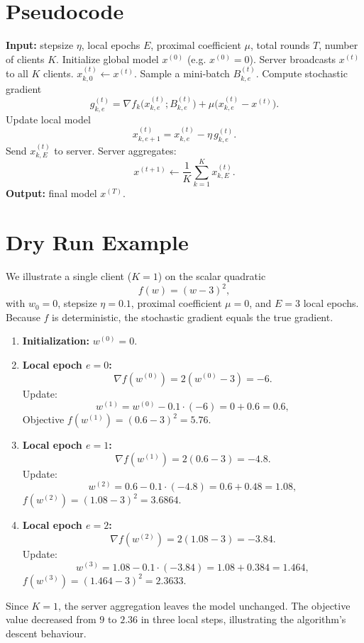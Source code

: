 \documentclass[11pt]{article}
\begin{document}
\section*{Pseudocode}
\begin{algorithm}[H]
\caption{FedProx with Local SGD}
\label{alg:fedprox}
\begin{algorithmic}[1]
\STATE \textbf{Input:} stepsize $\eta$, local epochs $E$, proximal coefficient $\mu$, 
total rounds $T$, number of clients $K$.
\STATE Initialize global model $x^{(0)}$ (e.g. $x^{(0)}=0$).
    \STATE Server broadcasts $x^{(t)}$ to all $K$ clients.
        \STATE $x^{(t)}_{k,0}\gets x^{(t)}$.
            \STATE Sample a mini‑batch $B^{(t)}_{k,e}$.
            \STATE Compute stochastic gradient
            \[
            g^{(t)}_{k,e}= \nabla f_k\bigl(x^{(t)}_{k,e};B^{(t)}_{k,e}\bigr)+\mu\bigl(x^{(t)}_{k,e}-x^{(t)}\bigr).
            \]
            \STATE Update local model
            \[
            x^{(t)}_{k,e+1}=x^{(t)}_{k,e}-\eta\, g^{(t)}_{k,e}.
            \]
        \ENDFOR
        \STATE Send $x^{(t)}_{k,E}$ to server.
    \ENDFOR
    \STATE Server aggregates:
    \[
    x^{(t+1)}\gets\frac{1}{K}\sum_{k=1}^{K}x^{(t)}_{k,E}.
    \]
\ENDFOR
\STATE \textbf{Output:} final model $x^{(T)}$.
\end{algorithmic}
\end{algorithm}

\section*{Dry Run Example}
We illustrate a single client ($K=1$) on the scalar quadratic
\[
f(w)=(w-3)^2,
\]
with $w_0=0$, stepsize $\eta=0.1$, proximal coefficient $\mu=0$, and $E=3$ local epochs.  
Because $f$ is deterministic, the stochastic gradient equals the true gradient.

\begin{enumerate}[label=Iteration \arabic*:, leftmargin=*]
\item \textbf{Initialization:} $w^{(0)}=0$.
\item \textbf{Local epoch $e=0$:}
    \[
    \nabla f(w^{(0)}) = 2(w^{(0)}-3) = -6.
    \]
    Update:
    \[
    w^{(1)} = w^{(0)} - 0.1\cdot(-6)=0+0.6=0.6,
    \]
    Objective $f(w^{(1)})=(0.6-3)^2=5.76$.
\item \textbf{Local epoch $e=1$:}
    \[
    \nabla f(w^{(1)}) = 2(0.6-3) = -4.8.
    \]
    Update:
    \[
    w^{(2)} = 0.6 -0.1\cdot(-4.8)=0.6+0.48=1.08,
    \]
    $f(w^{(2)})=(1.08-3)^2=3.6864$.
\item \textbf{Local epoch $e=2$:}
    \[
    \nabla f(w^{(2)}) = 2(1.08-3) = -3.84.
    \]
    Update:
    \[
    w^{(3)} = 1.08 -0.1\cdot(-3.84)=1.08+0.384=1.464,
    \]
    $f(w^{(3)})=(1.464-3)^2=2.3633$.
\end{enumerate}
Since $K=1$, the server aggregation leaves the model unchanged.  
The objective value decreased from $9$ to $2.36$ in three local steps, illustrating the algorithm’s descent behaviour.
\end{document}
